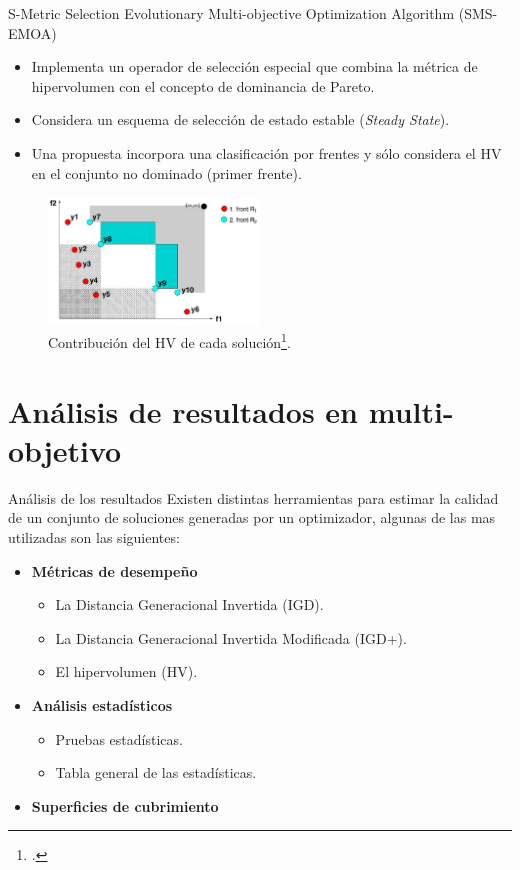 \documentclass{beamer}
\begin{document}
\begin{frame}{S-Metric Selection Evolutionary Multi-objective Optimization Algorithm (SMS-EMOA)}
\begin{itemize}
\scriptsize
\item Implementa un operador de selección especial que combina la métrica de hipervolumen con el concepto de dominancia de Pareto.
%
\item Considera un esquema de selección de estado estable (\textit{Steady State}).
\item Una propuesta incorpora una clasificación por frentes y sólo considera el HV en el conjunto no dominado (primer frente).
\end{itemize}
\begin{figure}[H]
\centering
\includegraphics[width=0.5\textwidth]{Images/sms_emoa.png}
\caption{\scriptsize Contribución del HV de cada solución\footcite{Joel:SMSEMOA}.}
\end{figure}
\end{frame}

\section{Análisis de resultados en multi-objetivo}

\begin{frame}{Análisis de los resultados}
Existen distintas herramientas para estimar la calidad de un conjunto de soluciones generadas por un optimizador, algunas de las mas utilizadas son las siguientes:
\begin{itemize}
\justifying
\item \textbf{Métricas de desempeño}
   \begin{itemize}
     \item La Distancia Generacional Invertida (IGD).
     \item La Distancia Generacional Invertida Modificada (IGD+).
     \item El hipervolumen (HV).
   \end{itemize}
\item \textbf{Análisis estadísticos}
  \begin{itemize}
      \item Pruebas estadísticas.
      \item Tabla general de las estadísticas.
  \end{itemize}
  \item \textbf{Superficies de cubrimiento}
\end{itemize}
\end{frame}
\end{document}
